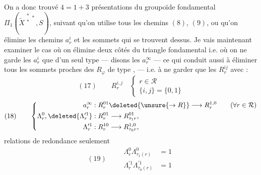 
On a donc trouvé $4=1+3$ présentations du groupoïde fondamental $\Pi_1(\widetilde{X}^{\substack{*\\*}*},S)$, suivant qu'on utilise tous les chemins $(8)$, $(9)$, ou qu'on élimine les chemins $a_r^i$  et les sommets qui se trouvent dessus. Je vais maintenant examiner le cas où on élimine \unsure{=} deux côtés du triangle fondamental i.e. où on ne garde les $a_r^i$ que d'un seul type --- disons les $a_r^\infty$ --- ce qui conduit aussi à éliminer tous les sommets proches des $R_\varphi$  de type  ,   --- i.e.  à ne garder que les $R_r^{ij}$ avec    :
\[
(17)\qquad R_r^{i,j}\quad\left\{\begin{array}{l}
r\in\mathcal{R}\\
\{i,j\}=\{0,1\}
\end{array}\right.
\]
\[
(18)\qquad\left\{\begin{aligned}
a_r^\infty &: R_r^{01}\deleted{\unsure{\to R}}\longrightarrow R_r^{1,0} \qquad(\forall r\in\mathcal{R})\\
\Lambda_r^0,\deleted{\Lambda_r^{\prime1}} &:R_r^{01}\longrightarrow R_{\tau_1r}^{01},\\
\Lambda_r^{\prime1} &:R_r^{10}\longrightarrow R_{\tau_0r}^{1,0},
\end{aligned}\right.
\]
 relations de redondance seulement
\[
(19)\qquad\boxed{\begin{aligned}
\Lambda_r^0\Lambda_{\tau_1(r)}^0&=1\\
\Lambda_r^{\prime1}\Lambda_{\tau_0(r)}^{\prime1}&=1
\end{aligned}}
\]
